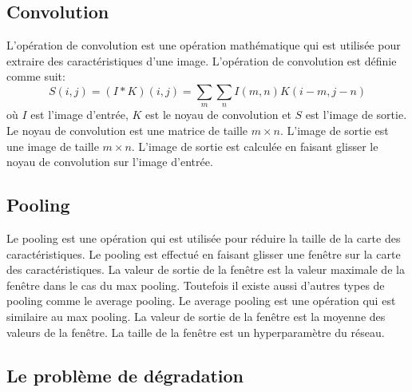 \documentclass{article}
\begin{document}
\subsection{Convolution}
L'opération de convolution est une opération mathématique qui est utilisée pour extraire des caractéristiques d'une image.
L'opération de convolution est définie comme suit:
\begin{equation}
    S(i, j) = (I * K)(i, j) = \sum_{m} \sum_{n} I(m, n)K(i - m, j - n)
\end{equation}
où $I$ est l'image d'entrée, $K$ est le noyau de convolution et $S$ est l'image de sortie.
Le noyau de convolution est une matrice de taille $m \times n$.
L'image de sortie est une image de taille $m \times n$.
L'image de sortie est calculée en faisant glisser le noyau de convolution sur l'image d'entrée.

\subsection{Pooling}
Le pooling est une opération qui est utilisée pour réduire la taille de la carte des caractéristiques.
Le pooling est effectué en faisant glisser une fenêtre sur la carte des caractéristiques.
La valeur de sortie de la fenêtre est la valeur maximale de la fenêtre dans le cas du max pooling.
Toutefois il existe aussi d'autres types de pooling comme le average pooling.
Le average pooling est une opération qui est similaire au max pooling.
La valeur de sortie de la fenêtre est la moyenne des valeurs de la fenêtre.
La taille de la fenêtre est un hyperparamètre du réseau.

\subsection{Le problème  de dégradation}
\end{document}
